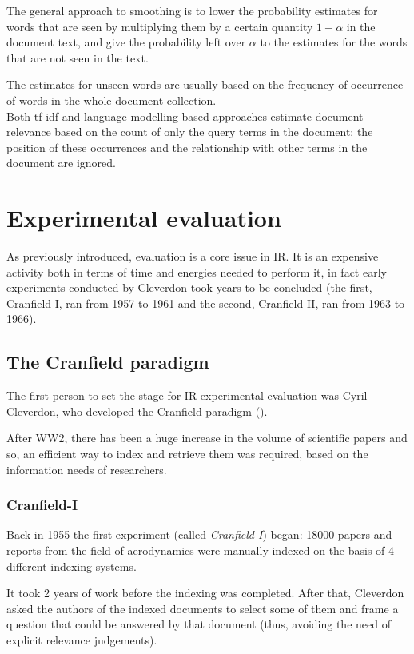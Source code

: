 The general approach to smoothing is to lower the probability estimates for words that are seen by multiplying them by a certain quantity $1- \alpha$ in the document text, and give the probability left over $\alpha$ to the estimates for the words that are not seen in the text.

The estimates for unseen words are usually based on the frequency of occurrence of words in the whole document collection. \\

Both tf-idf and language modelling based approaches estimate document relevance based on the count of only the query terms in the document; the position of these occurrences and the relationship with other terms in the document are ignored.

\section{Experimental evaluation}

As previously introduced, evaluation is a core issue in IR. It is an expensive activity both in terms of time and energies needed to perform it, in fact early experiments conducted by Cleverdon took years to be concluded (the first, Cranfield-I, ran from 1957 to 1961 and the second, Cranfield-II, ran from 1963 to 1966).

\subsection{The Cranfield paradigm}

The first person to set the stage for IR experimental evaluation was Cyril Cleverdon, who developed the Cranfield paradigm (\cite{harmaneval}).

After WW2, there has been a huge increase in the volume of scientific papers and so, an efficient way to index and retrieve them was required, based on the information needs of researchers.

\subsubsection{Cranfield-I}

Back in 1955 the first experiment (called \textit{Cranfield-I}) began: 18000 papers and reports from the field of aerodynamics were manually indexed on the basis of 4 different indexing systems.

It took 2 years of work before the indexing was completed. After that, Cleverdon asked the authors of the indexed documents to select some of them and frame a question that could be answered by that document (thus, avoiding the need of explicit relevance judgements).

